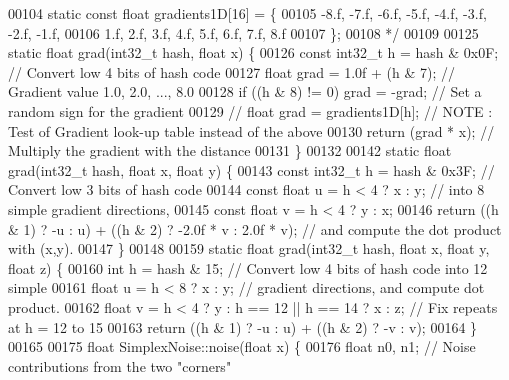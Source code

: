 \begin{DoxyCode}
00104 \textcolor{comment}{static const float gradients1D[16] = \{}
00105 \textcolor{comment}{        -8.f, -7.f, -6.f, -5.f, -4.f, -3.f, -2.f, -1.f,}
00106 \textcolor{comment}{         1.f,  2.f,  3.f,  4.f,  5.f,  6.f,  7.f,  8.f}
00107 \textcolor{comment}{\};}
00108 \textcolor{comment}{*/}
00109 
00125 \textcolor{keyword}{static} \textcolor{keywordtype}{float} grad(int32\_t hash, \textcolor{keywordtype}{float} x) \{
00126     \textcolor{keyword}{const} int32\_t h = hash & 0x0F;  \textcolor{comment}{// Convert low 4 bits of hash code}
00127     \textcolor{keywordtype}{float} grad = 1.0f + (h & 7);    \textcolor{comment}{// Gradient value 1.0, 2.0, ..., 8.0}
00128     \textcolor{keywordflow}{if} ((h & 8) != 0) grad = -grad; \textcolor{comment}{// Set a random sign for the gradient}
00129 \textcolor{comment}{//  float grad = gradients1D[h];    // NOTE : Test of Gradient look-up table instead of the above}
00130     \textcolor{keywordflow}{return} (grad * x);              \textcolor{comment}{// Multiply the gradient with the distance}
00131 \}
00132 
00142 \textcolor{keyword}{static} \textcolor{keywordtype}{float} grad(int32\_t hash, \textcolor{keywordtype}{float} x, \textcolor{keywordtype}{float} y) \{
00143     \textcolor{keyword}{const} int32\_t h = hash & 0x3F;  \textcolor{comment}{// Convert low 3 bits of hash code}
00144     \textcolor{keyword}{const} \textcolor{keywordtype}{float} u = h < 4 ? x : y;  \textcolor{comment}{// into 8 simple gradient directions,}
00145     \textcolor{keyword}{const} \textcolor{keywordtype}{float} v = h < 4 ? y : x;
00146     \textcolor{keywordflow}{return} ((h & 1) ? -u : u) + ((h & 2) ? -2.0f * v : 2.0f * v); \textcolor{comment}{// and compute the dot product with
       (x,y).}
00147 \}
00148 
00159 \textcolor{keyword}{static} \textcolor{keywordtype}{float} grad(int32\_t hash, \textcolor{keywordtype}{float} x, \textcolor{keywordtype}{float} y, \textcolor{keywordtype}{float} z) \{
00160     \textcolor{keywordtype}{int} h = hash & 15;     \textcolor{comment}{// Convert low 4 bits of hash code into 12 simple}
00161     \textcolor{keywordtype}{float} u = h < 8 ? x : y; \textcolor{comment}{// gradient directions, and compute dot product.}
00162     \textcolor{keywordtype}{float} v = h < 4 ? y : h == 12 || h == 14 ? x : z; \textcolor{comment}{// Fix repeats at h = 12 to 15}
00163     \textcolor{keywordflow}{return} ((h & 1) ? -u : u) + ((h & 2) ? -v : v);
00164 \}
00165 
00175 \textcolor{keywordtype}{float} SimplexNoise::noise(\textcolor{keywordtype}{float} x) \{
00176     \textcolor{keywordtype}{float} n0, n1;   \textcolor{comment}{// Noise contributions from the two "corners"}

\end{DoxyCode}

